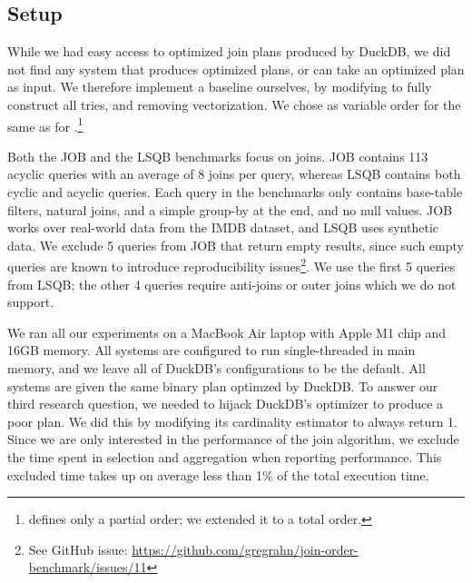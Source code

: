 
\subsection{Setup}

While we had easy access to optimized join plans produced by DuckDB,
we did not find any system that produces optimized \GJ plans, 
or can take an optimized plan as input.
We therefore implement a \GJ baseline ourselves,
by modifying \FJ to fully construct all tries, and removing
vectorization.  We chose as variable order for \GJ the same as for
\FJ.\footnote{\FJ defines only a partial order; we extended it to a
  total order.}


Both  the JOB and the LSQB benchmarks  focus on joins.
JOB contains 113 acyclic queries with an average of 8 joins per query,
  whereas LSQB contains both cyclic and acyclic queries.
Each query in the benchmarks only contains base-table filters, 
  natural joins, and a simple group-by at the end,
  and no null values.
JOB works over real-world data from the IMDB dataset, 
  and LSQB uses synthetic data.
We exclude 5 queries from JOB that return empty results, 
  since such empty queries are known to introduce reproducibility issues\footnote{
    See GitHub issue: \url{https://github.com/gregrahn/join-order-benchmark/issues/11}
  }.
We use the first 5 queries from LSQB; the other 4 queries require 
  anti-joins or outer joins which we do not support.

We ran all our experiments on a MacBook Air laptop with Apple M1 chip and 16GB memory. 
All systems are configured to run single-threaded in main memory, 
  and we leave all of DuckDB's configurations to be the default.
All systems are given the same binary plan optimzed by DuckDB.
To answer our third research question, 
  we needed to hijack DuckDB's optimizer to produce a poor plan.
We did this by modifying its cardinality estimator to always return 1.
Since we are only interested in the performance of the join algorithm, 
  we exclude the time spent in selection and aggregation 
  when reporting performance.
This excluded time takes up on average less than 1\% of the total execution time.


